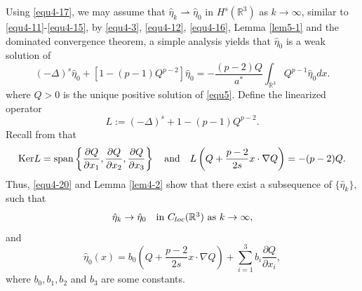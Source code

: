 \documentclass[reqno, 11pt]{amsart} %
\numberwithin{equation}{section}
\begin{document}
	Using \eqref{equ4-17}, we may assume that $\hat{\eta}_{k} \rightharpoonup\hat{\eta}_{0}$ in $H^{s}(\mathbb{R}^{3})$ as $k\rightarrow\infty$, similar to \eqref{equ4-11}-\eqref{equ4-15}, by \eqref{equ4-3}, \eqref{equ4-12}, \eqref{equ4-16}, Lemma \ref{lem5-1} and the dominated convergence theorem, a simple analysis yields that $\hat{\eta}_{0}$ is a weak solution of 
	\begin{equation}\label{equ4-20}
		(-\Delta)^{s}\hat{\eta}_{0}+\left[ 1-(p-1)Q^{p-2}\right] \hat{\eta}_{0}=-\frac{(p-2)Q}{a^{\ast}}\int_{\mathbb{R}^{3}}Q^{p-1}\hat{\eta}_{0}dx.
	\end{equation}
	where $Q>0$ is the unique positive solution of \eqref{equ5}. Define the linearized operator
	\begin{equation*}
		L:=	(-\Delta)^{s}+1-(p-1)Q^{p-2}.
	\end{equation*}
	Recall from \cite{FF} that
	\begin{equation*}
		{\rm Ker} L={\rm span}\left\lbrace \frac{\partial Q}{\partial x_{1}},  \frac{\partial Q}{\partial x_{2}},  \frac{\partial Q}{\partial x_{3}}\right\rbrace \quad \hbox{and}\quad L\left(Q+\frac{p-2}{2s}x\cdot\nabla Q\right)=-(p-2)Q.
	\end{equation*}
	Thus, \eqref{equ4-20} and Lemma \ref{lem4-2} show that there exist a subsequence of $\{\hat{\eta}_{k}\}$, such that
	\begin{equation}\label{equ4-21}
		\hat{\eta}_{k}\rightarrow\hat{\eta}_{0}\quad \hbox{in $C_{loc}(\mathbb{R}^{3})$ as $k\rightarrow\infty$},
	\end{equation}
	and
	\begin{equation}\label{equ4-22}
		\hat{\eta}_{0}(x)=b_{0}\left(Q+\frac{p-2}{2s}x\cdot\nabla Q\right)+\sum_{i=1}^{3}b_{i}\frac{\partial Q}{\partial x_{i}},
	\end{equation}
	where $b_{0}, b_{1}, b_{2}$ and $b_{3}$ are some constants.
	
\end{document}

